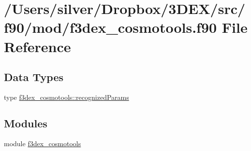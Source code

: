 \hypertarget{f3dex__cosmotools_8f90}{
\section{/Users/silver/Dropbox/3DEX/src/f90/mod/f3dex\_\-cosmotools.f90 File Reference}
\label{f3dex__cosmotools_8f90}
}
\subsection*{Data Types}
\begin{DoxyCompactItemize}
\item 
type \hyperlink{typef3dex__cosmotools_1_1recognized_params}{f3dex\_\-cosmotools::recognizedParams}
\end{DoxyCompactItemize}
\subsection*{Modules}
\begin{DoxyCompactItemize}
\item 
module \hyperlink{namespacef3dex__cosmotools}{f3dex\_\-cosmotools}
\end{DoxyCompactItemize}
